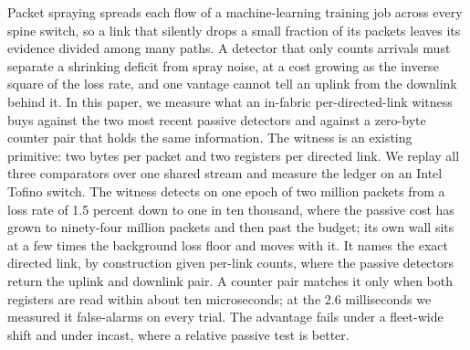 Packet spraying spreads each flow of a machine-learning training job across every spine switch, so a link that silently drops a small fraction of its packets leaves its evidence divided among many paths. A detector that only counts arrivals must separate a shrinking deficit from spray noise, at a cost growing as the inverse square of the loss rate, and one vantage cannot tell an uplink from the downlink behind it. In this paper, we measure what an in-fabric per-directed-link witness buys against the two most recent passive detectors and against a zero-byte counter pair that holds the same information. The witness is an existing primitive: two bytes per packet and two registers per directed link. We replay all three comparators over one shared stream and measure the ledger on an Intel Tofino switch. The witness detects on one epoch of two million packets from a loss rate of 1.5 percent down to one in ten thousand, where the passive cost has grown to ninety-four million packets and then past the budget; its own wall sits at a few times the background loss floor and moves with it. It names the exact directed link, by construction given per-link counts, where the passive detectors return the uplink and downlink pair. A counter pair matches it only when both registers are read within about ten microseconds; at the 2.6 milliseconds we measured it false-alarms on every trial. The advantage fails under a fleet-wide shift and under incast, where a relative passive test is better.
